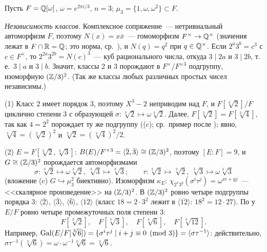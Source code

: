 \begin{example}
Пусть $F=\mathbb Q[\omega]$, $\omega=e^{2\pi i/3}$, $n=3$; $\mu_3=\{1,\omega,\omega^2\}\subset F$.

\emph{Независимость классов.} Комплексное сопряжение~--- нетривиальный автоморфизм $F$, поэтому $N(x)=x\bar x$~---
гомоморфизм $F^\times\to\mathbb Q^\times$ (значения лежат в $F\cap\mathbb R=\mathbb Q$; это норма, ср.\ ), и $N(q)=q^2$ при $q\in\mathbb Q^\times$. Если $2^a3^b=c^3$ с $c\in
F^\times$, то $2^{2a}3^{2b}=N(c)^3$~--- куб рационального числа, откуда $3\mid2a$ и $3\mid2b$, т.\,е.\ $3\mid a$ и $3\mid
b$. Значит, классы $2$ и $3$ порождают в $F^\times/F^{\times3}$ подгруппу, изоморфную $(\mathbb Z/3)^2$. (Так же классы любых
различных простых чисел независимы.)

(1) Класс $2$ имеет порядок $3$, поэтому $X^3-2$ неприводим над $F$, и $F[\sqrt[3]2]/F$ циклично степени $3$ с
образующей $\sigma\colon\sqrt[3]2\mapsto\omega\sqrt[3]2$. Далее, $F[\sqrt[3]2]=F[\sqrt[3]4]$, так как $4=2^2$ порождает ту
же подгруппу ((c); ср.\ пример после ); явно, $\sqrt[3]4=(\sqrt[3]2)^2$ и $\sqrt[3]2=(\sqrt[3]4)^2/2$.

(2) $E=F[\sqrt[3]2,\sqrt[3]3]$: $B(E)/F^{\times3}=\langle\bar2,\bar3\rangle\cong(\mathbb Z/3)^2$, поэтому $[E:F]=9$, и
$G\cong(\mathbb Z/3)^2$ порождается автоморфизмами
\[
\sigma\colon\sqrt[3]2\mapsto\omega\sqrt[3]2,\ \sqrt[3]3\mapsto\sqrt[3]3;\qquad
\tau\colon\sqrt[3]2\mapsto\sqrt[3]2,\ \sqrt[3]3\mapsto\omega\sqrt[3]3
\]
(вложение (c) $G\hookrightarrow\mu_3^2$ биективно). Изоморфизм $\kappa_E$:
$\chi_{2^x3^y}(\sigma^i\tau^j)=\omega^{xi+yj}$~--- <<скалярное произведение>> на $(\mathbb Z/3)^2$. В $(\mathbb Z/3)^2$ ровно четыре
подгруппы порядка $3$: $\langle\bar2\rangle$, $\langle\bar3\rangle$, $\langle\bar6\rangle$, $\langle\overline{12}\rangle$
(класс $18=2\cdot3^2$ лежит в $\langle\overline{12}\rangle$: $18^2=12\cdot27$). По  у $E/F$ ровно четыре промежуточных
поля степени $3$:
\[
F[\sqrt[3]2],\quad F[\sqrt[3]3],\quad F[\sqrt[3]6],\quad F[\sqrt[3]{12}].
\]
Например, $\operatorname{Gal}(E/F[\sqrt[3]6])=\{\sigma^i\tau^j\mid i+j\equiv0\pmod 3\}=\langle\sigma\tau^{-1}\rangle$: действительно,
$\sigma\tau^{-1}(\sqrt[3]6)=\omega\cdot\omega^{-1}\sqrt[3]6=\sqrt[3]6$.


\end{example}
